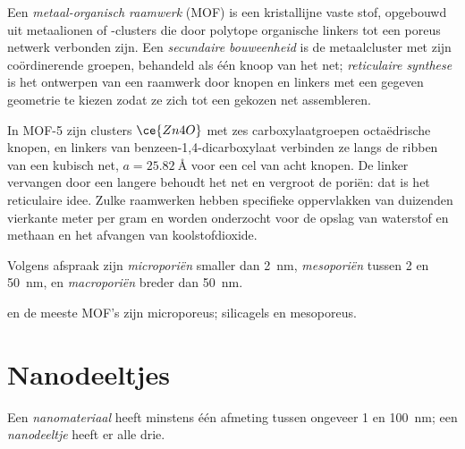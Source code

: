 \begin{definition}\label{def:b3:inorganic-materials:mof}
Een \emph{metaal-organisch raamwerk} (MOF)
is een kristallijne vaste stof, opgebouwd uit metaalionen of -clusters
die door polytope organische linkers tot een poreus netwerk verbonden
zijn. Een \emph{secundaire bouweenheid} is
de metaalcluster met zijn coördinerende groepen, behandeld als één knoop
van het net; \emph{reticulaire synthese} is
het ontwerpen van een raamwerk door knopen en linkers met een gegeven
geometrie te kiezen zodat ze zich tot een gekozen net assembleren.
\end{definition}

In MOF-5 zijn clusters $\ce{Zn4O}$ met zes carboxylaatgroepen octaëdrische knopen,
en linkers van benzeen-1,4-dicarboxylaat verbinden ze langs de ribben van
een kubisch net, $a = \qty{25.82}{\angstrom}$ voor een cel van acht knopen. De linker vervangen door een
langere behoudt het net en vergroot de poriën: dat is het reticulaire
idee. Zulke raamwerken hebben specifieke oppervlakken van duizenden
vierkante meter per gram en worden onderzocht voor de opslag van
waterstof en methaan en het afvangen van koolstofdioxide.

\begin{definition}[Poriegrootten]\label{def:b3:inorganic-materials:pores}
Volgens afspraak zijn \emph{microporiën} smaller dan
\qty{2}{nm},
\emph{mesoporiën} tussen 2 en \qty{50}{nm}, en
\emph{macroporiën} breder dan \qty{50}{nm}.
\end{definition}

 en de meeste MOF's zijn microporeus; silicagels en 
mesoporeus.

\section{Nanodeeltjes}

\begin{definition}[Nanomaterialen]\label{def:b3:inorganic-materials:nano}
Een \emph{nanomateriaal} heeft minstens één
afmeting tussen ongeveer 1 en \qty{100}{nm}; een
\emph{nanodeeltje} heeft er alle
drie.
\end{definition}

